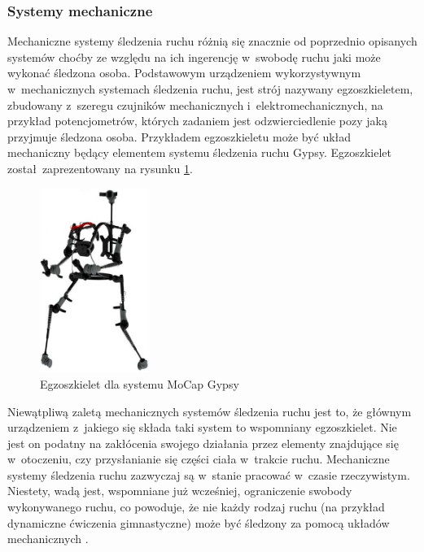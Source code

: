 \subsubsection*{Systemy mechaniczne}
Mechaniczne systemy śledzenia ruchu różnią się znacznie od poprzednio opisanych systemów choćby ze względu na ich ingerencję w~swobodę ruchu jaki może wykonać śledzona osoba. Podstawowym urządzeniem wykorzystywnym w~mechanicznych systemach śledzenia ruchu, jest strój nazywany egzoszkieletem, zbudowany z~szeregu czujników mechanicznych i~elektromechanicznych, na przykład potencjometrów, których zadaniem jest odzwierciedlenie pozy jaką przyjmuje śledzona osoba. Przykładem egzoszkieletu może być układ mechaniczny będący elementem systemu śledzenia ruchu Gypsy. Egzoszkielet został~zaprezentowany na rysunku \ref{fig:literature:footnote:gypsy:full}.
									
\begin{savenotes}
	\begin{figure}[!htb]
		\centering	
		\includegraphics[height=6cm]{images/gypsy7_full.jpg}
		\caption{Egzoszkielet dla systemu MoCap Gypsy}	
		\label{fig:literature:footnote:gypsy:full}
	\end{figure}
\end{savenotes}
											
Niewątpliwą zaletą mechanicznych systemów śledzenia ruchu jest to, że głównym urządzeniem z~jakiego się składa taki system to wspomniany egzoszkielet. Nie jest on podatny na zakłócenia swojego działania przez elementy znajdujące się w~otoczeniu, czy przysłanianie się części ciała w~trakcie ruchu. Mechaniczne systemy śledzenia ruchu zazwyczaj są w~stanie pracować w~czasie rzeczywistym. Niestety, wadą jest, wspomniane już wcześniej, ograniczenie swobody wykonywanego ruchu, co powoduje, że nie każdy rodzaj ruchu (na przykład dynamiczne ćwiczenia gimnastyczne) może być śledzony za pomocą układów mechanicznych .
											
